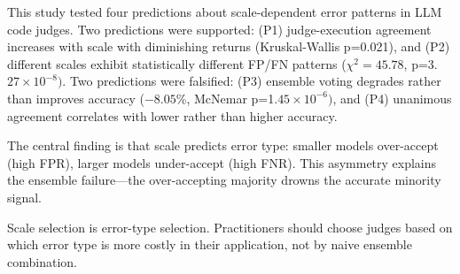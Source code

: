 
This study tested four predictions about scale-dependent error patterns in LLM code judges. Two predictions were supported: (P1) judge-execution agreement increases with scale with diminishing returns (Kruskal-Wallis p=0.021), and (P2) different scales exhibit statistically different FP/FN patterns ($\chi^{2}=45.78$, p=3.$27\times 10^{-8})$. Two predictions were falsified: (P3) ensemble voting degrades rather than improves accuracy ($-8.05$\%, McNemar p=1.$45\times 10^{-6})$, and (P4) unanimous agreement correlates with lower rather than higher accuracy.

The central finding is that scale predicts error type: smaller models over-accept (high FPR), larger models under-accept (high FNR). This asymmetry explains the ensemble failure---the over-accepting majority drowns the accurate minority signal.

Scale selection is error-type selection. Practitioners should choose judges based on which error type is more costly in their application, not by naive ensemble combination.

